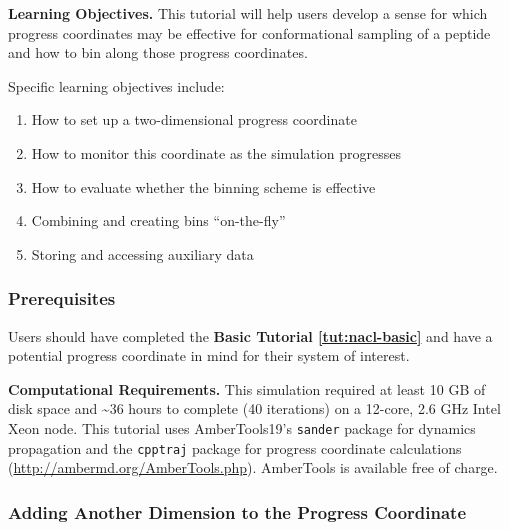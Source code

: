 \textbf{Learning Objectives.} This tutorial will help users develop a sense for which progress coordinates may be effective for conformational sampling of a peptide and how to bin along those progress coordinates.  

Specific learning objectives include:
\begin{enumerate}
\item How to set up a two-dimensional progress coordinate
\item How to monitor this coordinate as the simulation progresses
\item How to evaluate whether the binning scheme is effective
\item Combining and creating bins “on-the-fly”
\item Storing and accessing auxiliary data
\end{enumerate}

\subsubsection{Prerequisites}

Users should have completed the \textbf{Basic Tutorial \ref{tut:nacl-basic}} and have a potential progress coordinate in mind for their system of interest. 

\textbf{Computational Requirements.} This simulation required at least 10 GB of disk space and \textasciitilde 36 hours to complete (40 iterations) on a 12-core, 2.6 GHz Intel Xeon node.
This tutorial uses AmberTools19’s \verb|sander| package for dynamics propagation and the  \verb|cpptraj| package for progress coordinate calculations (\url{http://ambermd.org/AmberTools.php}).  
AmberTools is available free of charge.

\subsubsection{Adding Another Dimension to the Progress Coordinate}


